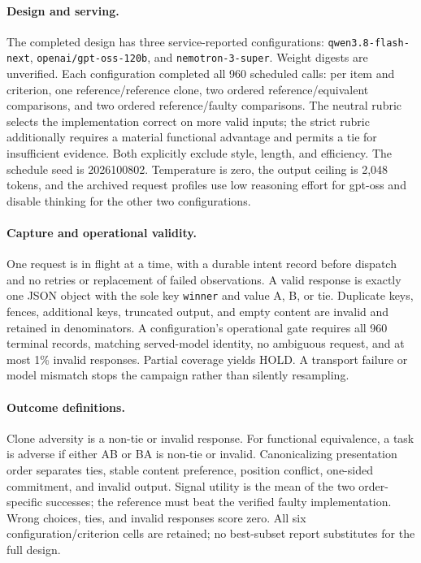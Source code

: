 \documentclass[10pt]{article}
\begin{document}
\paragraph{Design and serving.}
The completed design has three service-reported configurations: \texttt{qwen3.8-\allowbreak flash-\allowbreak next}, \texttt{openai/\allowbreak gpt-oss-\allowbreak120b}, and \texttt{nemotron-3-\allowbreak super}. Weight digests are unverified. Each configuration completed all 960 scheduled calls: per item and criterion, one reference/reference clone, two ordered reference/equivalent comparisons, and two ordered reference/faulty comparisons. The neutral rubric selects the implementation correct on more valid inputs; the strict rubric additionally requires a material functional advantage and permits a tie for insufficient evidence. Both explicitly exclude style, length, and efficiency. The schedule seed is 2026100802. Temperature is zero, the output ceiling is 2,048 tokens, and the archived request profiles use low reasoning effort for gpt-oss and disable thinking for the other two configurations.

\paragraph{Capture and operational validity.}
One request is in flight at a time, with a durable intent record before dispatch and no retries or replacement of failed observations. A valid response is exactly one JSON object with the sole key \texttt{winner} and value A, B, or tie. Duplicate keys, fences, additional keys, truncated output, and empty content are invalid and retained in denominators. A configuration's operational gate requires all 960 terminal records, matching served-model identity, no ambiguous request, and at most 1\% invalid responses. Partial coverage yields HOLD. A transport failure or model mismatch stops the campaign rather than silently resampling.

\paragraph{Outcome definitions.}
Clone adversity is a non-tie or invalid response. For functional equivalence, a task is adverse if either AB or BA is non-tie or invalid. Canonicalizing presentation order separates ties, stable content preference, position conflict, one-sided commitment, and invalid output. Signal utility is the mean of the two order-specific successes; the reference must beat the verified faulty implementation. Wrong choices, ties, and invalid responses score zero. All six configuration/criterion cells are retained; no best-subset report substitutes for the full design.
\end{document}
